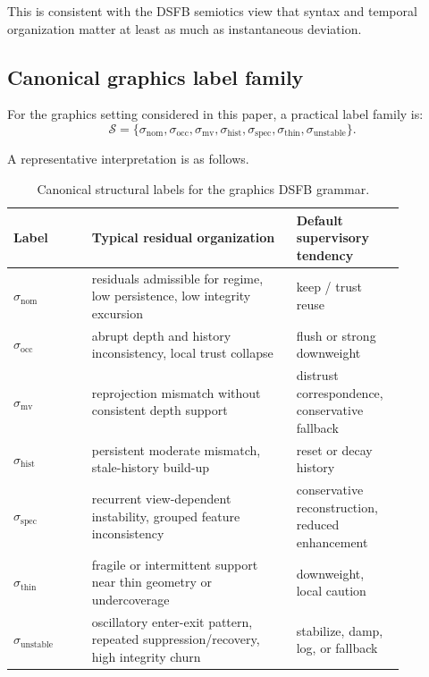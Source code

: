 \documentclass[11pt,letterpaper]{article}
\theoremstyle{gcresult}
\theoremstyle{definition}
\begin{document}
This is consistent with the DSFB semiotics view that syntax and temporal organization matter at least as much as instantaneous deviation. 


\subsection{Canonical graphics label family}

For the graphics setting considered in this paper, a practical label family is:
\begin{equation}
\mathcal S=
\{\sigma_{\mathrm{nom}},\sigma_{\mathrm{occ}},\sigma_{\mathrm{mv}},\sigma_{\mathrm{hist}},\sigma_{\mathrm{spec}},\sigma_{\mathrm{thin}},\sigma_{\mathrm{unstable}}\}.
\end{equation}

A representative interpretation is as follows.

\begin{table}[H]
\centering
\caption{Canonical structural labels for the graphics DSFB grammar.}
\begin{tabular}{>{\raggedright\arraybackslash}p{0.18\linewidth} >{\raggedright\arraybackslash}p{0.47\linewidth} >{\raggedright\arraybackslash}p{0.22\linewidth}}
\toprule
Label & Typical residual organization & Default supervisory tendency \\
\midrule
$\sigma_{\mathrm{nom}}$ & residuals admissible for regime, low persistence, low integrity excursion & keep / trust reuse \\
$\sigma_{\mathrm{occ}}$ & abrupt depth and history inconsistency, local trust collapse & flush or strong downweight \\
$\sigma_{\mathrm{mv}}$ & reprojection mismatch without consistent depth support & distrust correspondence, conservative fallback \\
$\sigma_{\mathrm{hist}}$ & persistent moderate mismatch, stale-history build-up & reset or decay history \\
$\sigma_{\mathrm{spec}}$ & recurrent view-dependent instability, grouped feature inconsistency & conservative reconstruction, reduced enhancement \\
$\sigma_{\mathrm{thin}}$ & fragile or intermittent support near thin geometry or undercoverage & downweight, local caution \\
$\sigma_{\mathrm{unstable}}$ & oscillatory enter-exit pattern, repeated suppression/recovery, high integrity churn & stabilize, damp, log, or fallback \\
\bottomrule
\end{tabular}
\end{table}
\end{document}
